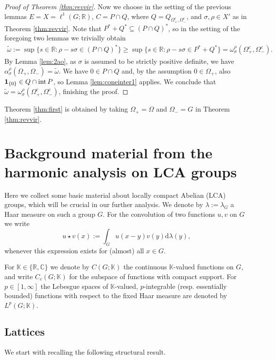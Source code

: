 \documentclass[[a4paper,english,12pt]{amsart}
\theoremstyle{plain}
\theoremstyle{remark}
\newcommand{\intt}{\mbox{\rm int\,}}
\newcommand{\KK}{\mathbb K}
\newcommand{\RR}{\mathbb R}
\newcommand{\CC}{\mathbb C}
\def\dd{\mathrm{d}}
\def\haar{\lambda}
\def\car{\mathbf{1}}
\newcommand{\si}{\sigma}
\newcommand{\rh}{\rho}
\begin{document}
\begin{proof}[Proof of Theorem \ref{thm:revvir}]
Now we choose in the setting of the previous lemmas $E=X=\ell^{1}(G;\RR)$, $C=P\cap Q$, where $Q=Q_{\Omega_+^c,\Omega_-^c}$, and $\si,\rh\in X'$ as in Theorem \ref{thm:revvir}.
Note that $P^*+Q^*\subseteq (P\cap Q)^*$, so in the setting of the foregoing two lemmas we trivially obtain
	   \begin{align*}
	 \widetilde{\omega}:=\sup\{s\in \RR:\rh-s\si\in  (P\cap Q)^*\}\geq \sup\{s\in \RR:\rh-s\si\in  P^*+Q^*\}=\omega_\si^\rh(\Omega_+^c,\Omega_-^c).
	 \end{align*}
By Lemma \ref{lem:2ao}, as $\si$ is assumed to be  strictly positive definite, we have $\alpha_\si^\rh(\Omega_+,\Omega_-)=\widetilde{\omega}$. We have $0\in P\cap Q$ and, by the assumption $0\in \Omega_+$, also $\car_{\{0\}}\in Q\cap \intt P$, so Lemma \ref{lem:coneinter1} applies. We conclude that
	 $\widetilde{\omega}=\omega_\si^\rh(\Omega_+^c,\Omega_-^c)$, finishing the proof.
	\end{proof}
	
	Theorem \ref{thm:first} is obtained by taking $\Omega_+=\Omega$ and $\Omega_-=G$ in Theorem \ref{thm:revvir}.



\section{Background material from the harmonic analysis on LCA groups}
\label{sec:lcaback}

Here we collect some basic material about  locally compact Abelian (LCA) groups, which will be crucial in our further analysis. We denote by $\haar:=\haar_G$ a Haar measure on such a group $G$. 
For the convolution of two functions $u,v$ on $G$ we write
\[
u\star v(x):=\int_Gu(x-y)v(y)\dd\lambda(y),
\]
whenever this expression exists for (almost) all $x\in G$.

For $\KK\in\{\RR,\CC\}$ we denote by $C(G;\KK)$ the continuous $\KK$-valued functions on $G$, and write $C_c(G;\KK)$ for the subspace of functions with compact support. For $p\in [1,\infty]$ the Lebesgue spaces of $\KK$-valued, $p$-integrable  (resp.{} essentially bounded) functions with respect to the fixed Haar measure are denoted by $L^p(G;\KK)$.

\subsection{Lattices}
We start with recalling the following  structural result.
\end{document}
